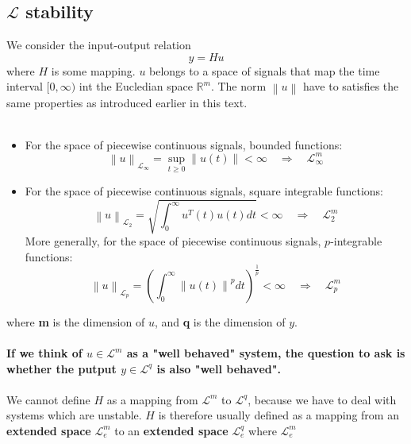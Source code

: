\documentclass{article}
\begin{document}
\subsection{$\mathcal{L}$ stability}
We consider the input-output relation
\begin{equation}
	y = H u
	\label{eqn: i-o-relation}
\end{equation}
where $H$ is some mapping. $u$ belongs to a space of signals that map the time interval $[0, \infty )$ int the Eucledian space $\mathbb{R}^m$. The norm $\left\| u \right\| $ have to satisfies the same properties as introduced earlier in this text.
\\\\
\begin{itemize}
	\item For the space of piecewise continuous signals, bounded functions:
	      \begin{equation}
		      \left\| u \right\| _{\mathcal{L}_\infty } = \sup_{t \geq 0} \left\| u(t) \right\| < \infty \quad \Rightarrow  \quad \mathcal{L}^m_\infty
	      \end{equation}
	\item For the space of piecewise continuous signals, square integrable functions:
	      \begin{equation}
		      \left\| u \right\|_{\mathcal{L}_2} = \sqrt{\int_{0}^{\infty} u^T(t) u(t) dt} < \infty \quad \Rightarrow  \quad \mathcal{L}^m_2
	      \end{equation}
	      More generally, for the space of piecewise continuous signals, $p$-integrable functions:
	      \begin{equation}
		      \left\| u \right\|_{\mathcal{L}_p} = \left( \int_{0}^{\infty} \left\| u(t) \right\|^p dt \right)^{\frac{1}{p}} < \infty \quad \Rightarrow  \quad \mathcal{L}^m_p
	      \end{equation}
\end{itemize}
where \textbf{m} is the dimension of $u$, and \textbf{q} is the dimension of $y$.
\\\\
\textbf{If we think of $u \in  \mathcal{L}^m$ as a "well behaved" system, the question to ask is whether the putput $y \in \mathcal{L}^q$ is also "well behaved".}
\\\\
We cannot define $H$ as a mapping from $\mathcal{L}^m$ to $\mathcal{L}^q$, because we have to deal with systems which are unstable. $H$ is therefore usually defined as a mapping from an \textbf{extended space} $\mathcal{L}_e^m$ to an \textbf{extended space} $\mathcal{L}_e^q$ where $\mathcal{L}_e^m$
\end{document}
